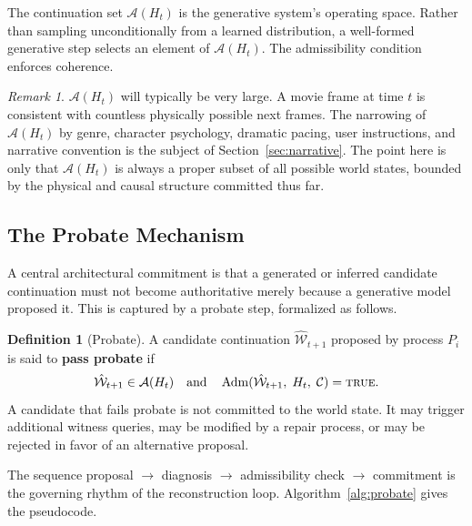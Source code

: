 \documentclass[11pt,a4paper]{article}
\theoremstyle{plain}
\theoremstyle{definition}
\newtheorem{definition}[theorem]{Definition}
\theoremstyle{remark}
\newtheorem{remark}[theorem]{Remark}
\DeclareMathOperator{\Adm}{Adm}
\begin{document}
The continuation set $\mathcal{A}(H_t)$ is the generative system's operating space. Rather than sampling unconditionally from a learned distribution, a well-formed generative step selects an element of $\mathcal{A}(H_t)$. The admissibility condition enforces coherence.

\begin{remark}
$\mathcal{A}(H_t)$ will typically be very large. A movie frame at time $t$ is consistent with countless physically possible next frames. The narrowing of $\mathcal{A}(H_t)$ by genre, character psychology, dramatic pacing, user instructions, and narrative convention is the subject of Section~\ref{sec:narrative}. The point here is only that $\mathcal{A}(H_t)$ is always a proper subset of all possible world states, bounded by the physical and causal structure committed thus far.
\end{remark}

\subsection{The Probate Mechanism}

A central architectural commitment is that a generated or inferred candidate continuation must not become authoritative merely because a generative model proposed it. This is captured by a probate step, formalized as follows.

\begin{definition}[Probate]
A candidate continuation $\hat{\mathcal{W}}_{t+1}$ proposed by process $P_i$ is said to \textbf{pass probate} if
\[
\hat{\mathcal{W}}_{t+1} \in \mathcal{A}(H_t) \quad \text{and} \quad \Adm(\hat{\mathcal{W}}_{t+1},\; H_t,\; \mathcal{C}) = \textsc{true}.
\]
A candidate that fails probate is not committed to the world state. It may trigger additional witness queries, may be modified by a repair process, or may be rejected in favor of an alternative proposal.
\end{definition}

The sequence proposal $\to$ diagnosis $\to$ admissibility check $\to$ commitment is the governing rhythm of the reconstruction loop. Algorithm~\ref{alg:probate} gives the pseudocode.
\end{document}
